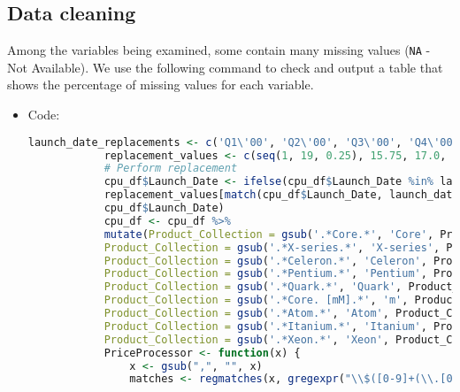 \documentclass{article}
\begin{document}
	\subsection{Data cleaning}
	Among the variables being examined, some contain many missing values (\texttt{NA} - Not Available). We use the following command to check and output a table that shows the percentage of missing values for each variable.
	\begin{itemize}
		\item Code:
		\begin{lstlisting}[language=R]
			launch_date_replacements <- c('Q1\'00', 'Q2\'00', 'Q3\'00', 'Q4\'00', 'Q1\'01', 'Q2\'01', 'Q3\'01', 'Q4\'01', 'Q1\'02', 'Q2\'02', 'Q3\'02', 'Q4\'02', 'Q1\'03', 'Q2\'03', 'Q3\'03', 'Q4\'03', 'Q1\'04', 'Q2\'04', 'Q3\'04', 'Q4\'04', 'Q1\'05', 'Q2\'05', 'Q3\'05', 'Q4\'05', 'Q1\'06', 'Q2\'06', 'Q3\'06', 'Q4\'06', 'Q1\'07', 'Q2\'07', 'Q3\'07', 'Q4\'07', 'Q1\'08', 'Q2\'08', 'Q3\'08', 'Q4\'08', 'Q1\'09', 'Q2\'09', 'Q3\'09', 'Q4\'09', 'Q1\'10', 'Q2\'10', 'Q3\'10', 'Q4\'10', 'Q1\'11', 'Q2\'11', 'Q3\'11', 'Q4\'11', 'Q1\'12', 'Q2\'12', 'Q3\'12', 'Q4\'12', 'Q1\'13', 'Q2\'13', 'Q3\'13', 'Q4\'13', 'Q1\'14', 'Q2\'14', 'Q3\'14', 'Q4\'14', 'Q1\'15', 'Q2\'15', 'Q3\'15', 'Q4\'15', 'Q1\'16', 'Q2\'16', 'Q3\'16', 'Q4\'16', 'Q1\'17', 'Q2\'17', 'Q3\'17', 'Q4\'17', 'Q1\'18', 'Q2\'18', 'Q3\'18', 'Q4\'18', 'Q1 \'15', '04\'16', 'Q1\'99', 'Q2\'99')
			replacement_values <- c(seq(1, 19, 0.25), 15.75, 17.0, 0.0, 0.25)
			# Perform replacement
			cpu_df$Launch_Date <- ifelse(cpu_df$Launch_Date %in% launch_date_replacements, 
			replacement_values[match(cpu_df$Launch_Date, launch_date_replacements)], 
			cpu_df$Launch_Date)
			cpu_df <- cpu_df %>%
			mutate(Product_Collection = gsub('.*Core.*', 'Core', Product_Collection),
			Product_Collection = gsub('.*X-series.*', 'X-series', Product_Collection),
			Product_Collection = gsub('.*Celeron.*', 'Celeron', Product_Collection),
			Product_Collection = gsub('.*Pentium.*', 'Pentium', Product_Collection),
			Product_Collection = gsub('.*Quark.*', 'Quark', Product_Collection),
			Product_Collection = gsub('.*Core. [mM].*', 'm', Product_Collection),
			Product_Collection = gsub('.*Atom.*', 'Atom', Product_Collection),
			Product_Collection = gsub('.*Itanium.*', 'Itanium', Product_Collection),
			Product_Collection = gsub('.*Xeon.*', 'Xeon', Product_Collection))
			PriceProcessor <- function(x) {
				x <- gsub(",", "", x)
				matches <- regmatches(x, gregexpr("\\$([0-9]+(\\.[0-9]+)?)", x))

\end{lstlisting}
\end{itemize}
\end{document}
